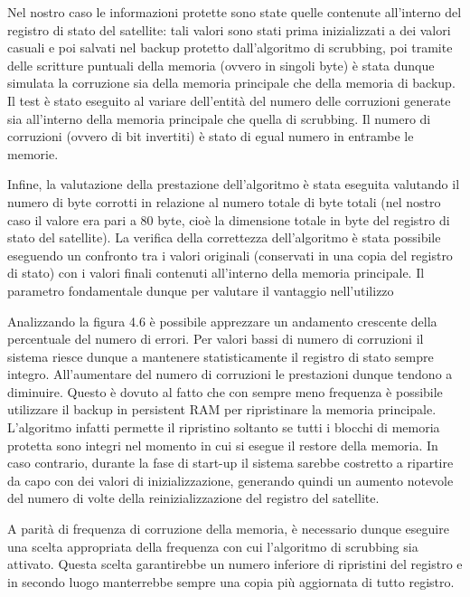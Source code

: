 \documentclass[LaM,binding=0.6cm]{../sapthesis}
\begin{document}
Nel nostro caso le informazioni protette sono state quelle contenute all'interno del registro di stato del satellite: tali valori sono stati prima inizializzati a dei valori casuali e poi salvati nel backup protetto dall'algoritmo di scrubbing, poi tramite delle scritture puntuali della memoria (ovvero in singoli byte) è stata dunque simulata la corruzione sia della memoria principale che della memoria di backup. \newline\newline
Il test è stato eseguito al variare dell'entità del numero delle corruzioni generate sia all'interno della memoria principale che quella di scrubbing. Il numero di corruzioni (ovvero di bit invertiti) è stato di egual numero in entrambe le memorie.

Infine, la valutazione della prestazione dell'algoritmo è stata eseguita valutando il numero di byte corrotti in relazione al numero totale di byte totali (nel nostro caso il valore era pari a 80 byte, cioè la dimensione totale in byte del registro di stato del satellite). 
La verifica della correttezza dell'algoritmo è stata possibile eseguendo un confronto tra i valori originali (conservati in una copia del registro di stato) con i valori finali contenuti all'interno della memoria principale. Il parametro fondamentale dunque per valutare il vantaggio nell'utilizzo 

\newpage

Analizzando la figura 4.6 è possibile apprezzare un andamento crescente della percentuale del numero di errori. Per valori bassi di numero di corruzioni il sistema riesce dunque a mantenere statisticamente il registro di stato sempre integro. All'aumentare del numero di corruzioni le prestazioni dunque tendono a diminuire. Questo è dovuto al fatto che con sempre meno frequenza è possibile utilizzare il backup in persistent RAM per ripristinare la memoria principale. L'algoritmo infatti permette il ripristino soltanto se tutti i blocchi di memoria protetta sono integri nel momento in cui si esegue il restore della memoria. In caso contrario, durante la fase di start-up il sistema sarebbe costretto a ripartire da capo con dei valori di inizializzazione, generando quindi un aumento notevole del numero di volte della reinizializzazione del registro del satellite. 

A parità di frequenza di corruzione della memoria, è necessario dunque eseguire una scelta appropriata della frequenza con cui l'algoritmo di scrubbing sia attivato. Questa scelta garantirebbe un numero inferiore di ripristini del registro e in secondo luogo manterrebbe sempre una copia più aggiornata di tutto registro.
\end{document}
